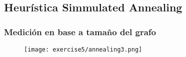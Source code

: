 \subsection{Heurística Simmulated Annealing}

\subsubsection{Medición en base a tamaño del grafo}

\begin{figure}[H]
	\centering
	\texttt{[image: exercise5/annealing3.png]}
\end{figure}